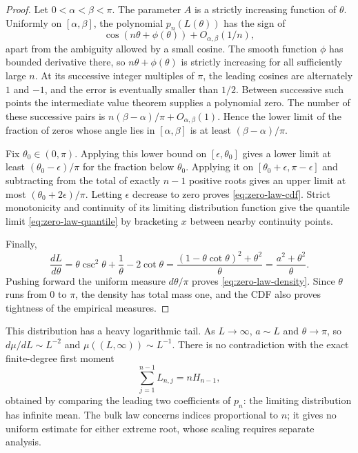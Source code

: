 \documentclass[11pt]{article}
\numberwithin{equation}{section}
\theoremstyle{definition}
\theoremstyle{remark}
\begin{document}
\begin{proof}
Let $0<\alpha<\beta<\pi$.  The parameter $A$ is a strictly increasing
function of $\theta$.  Uniformly on $[\alpha,\beta]$, the polynomial
$p_n(L(\theta))$ has the sign of
\[
 \cos(n\theta+\phi(\theta))+O_{\alpha,\beta}(1/n),
\]
apart from the ambiguity allowed by a small cosine.  The smooth function
$\phi$ has bounded derivative there, so $n\theta+\phi(\theta)$ is
strictly increasing for all sufficiently large $n$.  At its successive
integer multiples of $\pi$, the leading cosines are alternately $1$
and $-1$, and the error is eventually smaller than $1/2$.  Between
successive such points the intermediate value theorem supplies a
polynomial zero.  The number of these successive pairs is
$n(\beta-\alpha)/\pi+O_{\alpha,\beta}(1)$.  Hence the lower limit
of the fraction of zeros whose angle lies in $[\alpha,\beta]$ is at
least $(\beta-\alpha)/\pi$.

Fix $\theta_0\in(0,\pi)$.  Applying this lower bound on
$[\epsilon,\theta_0]$ gives a lower limit at least
$(\theta_0-\epsilon)/\pi$ for the fraction below $\theta_0$.
Applying it on $[\theta_0+\epsilon,\pi-\epsilon]$ and subtracting
from the total of exactly $n-1$ positive roots gives an upper limit
at most $(\theta_0+2\epsilon)/\pi$.  Letting $\epsilon$ decrease
to zero proves \eqref{eq:zero-law-cdf}.  Strict monotonicity and
continuity of its limiting distribution function give the quantile
limit \eqref{eq:zero-law-quantile} by bracketing $x$ between nearby
continuity points.

Finally,
\[
 \frac{dL}{d\theta}
   =\theta\csc^2\theta+\frac1\theta-2\cot\theta
   =\frac{(1-\theta\cot\theta)^2+\theta^2}{\theta}
   =\frac{a^2+\theta^2}{\theta}.
\]
Pushing forward the uniform measure $d\theta/\pi$ proves
\eqref{eq:zero-law-density}.  Since $\theta$ runs from $0$ to $\pi$,
the density has total mass one, and the CDF also proves tightness of the
empirical measures.
\end{proof}

This distribution has a heavy logarithmic tail.  As $L\to\infty$,
$a\sim L$ and $\theta\to\pi$, so $d\mu/dL\sim L^{-2}$ and
$\mu((L,\infty))\sim L^{-1}$.  There is no contradiction with the
exact finite-degree first moment
\begin{equation}\label{eq:zero-law-exact-moment}
 \sum_{j=1}^{n-1}L_{n,j}=nH_{n-1},
\end{equation}
obtained by comparing the leading two coefficients of $p_n$: the
limiting distribution has infinite mean.  The bulk law concerns indices
proportional to $n$; it gives no uniform estimate for either extreme
root, whose scaling requires separate analysis.
\end{document}
